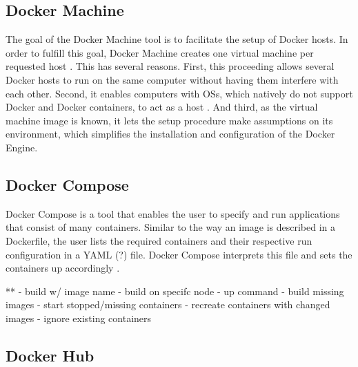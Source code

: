 
  \subsection{Docker Machine} %
  \label{sub:docker_machine}
    The goal of the Docker Machine tool is to facilitate the setup of Docker hosts. In order to fulfill this goal, Docker Machine creates one virtual machine per requested host \cite{Docker????Dockerb,Docker????Dockera}. This has several reasons. First, this proceeding allows several Docker hosts to run on the same computer without having them interfere with each other. Second, it enables computers with \acp{OS}, which natively do not support Docker and Docker containers, to act as a host \cite{Docker????Dockera}. And third, as the virtual machine image is known, it lets the setup procedure make assumptions on its environment, which simplifies the installation and configuration of the Docker Engine.

  \subsection{Docker Compose} %
  \label{sub:docker_compose}
    Docker Compose is a tool that enables the user to specify and run applications that consist of many containers. Similar to the way an image is described in a Dockerfile, the user lists the required containers and their respective run configuration in a YAML (?) file. Docker Compose interprets this file and sets the containers up accordingly \cite{Docker????Dockerb}.


    **  - build w/ image name
        - build on specifc node
        - up command
          - build missing images
          - start stopped/missing containers
          - recreate containers with changed images
          - ignore existing containers


  \subsection{Docker Hub} %
  \label{sub:docker_hub}


